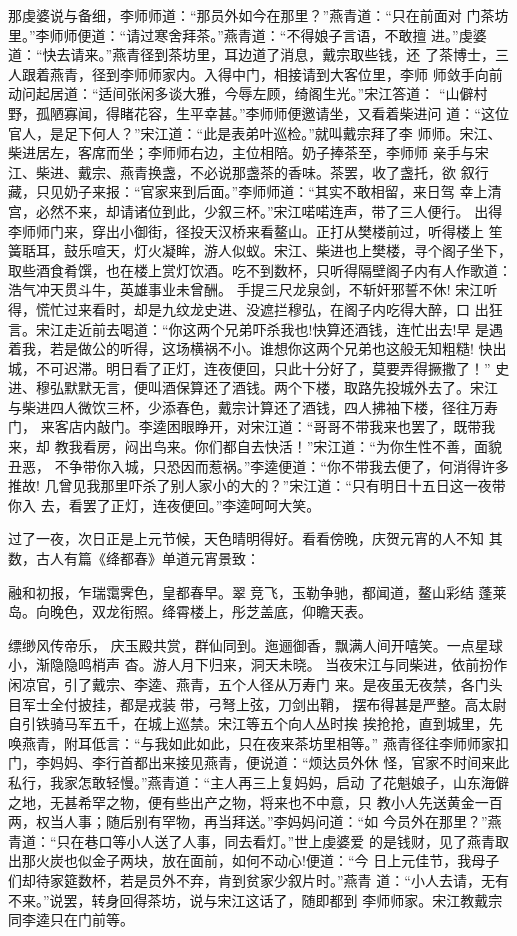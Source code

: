 那虔婆说与备细，李师师道：“那员外如今在那里？”燕青道：“只在前面对
门茶坊里。”李师师便道：“请过寒舍拜茶。”燕青道：“不得娘子言语，不敢擅
进。”虔婆道：“快去请来。”燕青径到茶坊里，耳边道了消息，戴宗取些钱，还
了茶博士，三人跟着燕青，径到李师师家内。入得中门，相接请到大客位里，李师
师敛手向前动问起居道：“适间张闲多谈大雅，今辱左顾，绮阁生光。”宋江答道：
“山僻村野，孤陋寡闻，得睹花容，生平幸甚。”李师师便邀请坐，又看着柴进问
道：“这位官人，是足下何人？”宋江道：“此是表弟叶巡检。”就叫戴宗拜了李
师师。宋江、柴进居左，客席而坐；李师师右边，主位相陪。奶子捧茶至，李师师
亲手与宋江、柴进、戴宗、燕青换盏，不必说那盏茶的香味。茶罢，收了盏托，欲
叙行藏，只见奶子来报：“官家来到后面。”李师师道：“其实不敢相留，来日驾
幸上清宫，必然不来，却请诸位到此，少叙三杯。”宋江喏喏连声，带了三人便行。
出得李师师门来，穿出小御街，径投天汉桥来看鳌山。正打从樊楼前过，听得楼上
笙簧聒耳，鼓乐喧天，灯火凝眸，游人似蚁。宋江、柴进也上樊楼，寻个阁子坐下，
取些酒食肴馔，也在楼上赏灯饮酒。吃不到数杯，只听得隔壁阁子内有人作歌道：
浩气冲天贯斗牛，英雄事业未曾酬。
手提三尺龙泉剑，不斩奸邪誓不休!
宋江听得，慌忙过来看时，却是九纹龙史进、没遮拦穆弘，在阁子内吃得大醉，口
出狂言。宋江走近前去喝道：“你这两个兄弟吓杀我也!快算还酒钱，连忙出去!早
是遇着我，若是做公的听得，这场横祸不小。谁想你这两个兄弟也这般无知粗糙!
快出城，不可迟滞。明日看了正灯，连夜便回，只此十分好了，莫要弄得撅撒了！”
史进、穆弘默默无言，便叫酒保算还了酒钱。两个下楼，取路先投城外去了。宋江
与柴进四人微饮三杯，少添春色，戴宗计算还了酒钱，四人拂袖下楼，径往万寿门，
来客店内敲门。李逵困眼睁开，对宋江道：“哥哥不带我来也罢了，既带我来，却
教我看房，闷出鸟来。你们都自去快活！”宋江道：“为你生性不善，面貌丑恶，
不争带你入城，只恐因而惹祸。”李逵便道：“你不带我去便了，何消得许多推故!
几曾见我那里吓杀了别人家小的大的？”宋江道：“只有明日十五日这一夜带你入
去，看罢了正灯，连夜便回。”李逵呵呵大笑。

过了一夜，次日正是上元节候，天色晴明得好。看看傍晚，庆贺元宵的人不知
其数，古人有篇《绛都春》单道元宵景致：

融和初报，乍瑞霭霁色，皇都春早。翠竞飞，玉勒争驰，都闻道，鳌山彩结
蓬莱岛。向晚色，双龙衔照。绛霄楼上，彤芝盖底，仰瞻天表。

缥缈风传帝乐，
庆玉殿共赏，群仙同到。迤逦御香，飘满人间开嘻笑。一点星球小，渐隐隐鸣梢声
杳。游人月下归来，洞天未晓。
当夜宋江与同柴进，依前扮作闲凉官，引了戴宗、李逵、燕青，五个人径从万寿门
来。是夜虽无夜禁，各门头目军士全付披挂，都是戎装带，弓弩上弦，刀剑出鞘，
摆布得甚是严整。高太尉自引铁骑马军五千，在城上巡禁。宋江等五个向人丛时挨
挨抢抢，直到城里，先唤燕青，附耳低言：“与我如此如此，只在夜来茶坊里相等。”
燕青径往李师师家扣门，李妈妈、李行首都出来接见燕青，便说道：“烦达员外休
怪，官家不时间来此私行，我家怎敢轻慢。”燕青道：“主人再三上复妈妈，启动
了花魁娘子，山东海僻之地，无甚希罕之物，便有些出产之物，将来也不中意，只
教小人先送黄金一百两，权当人事；随后别有罕物，再当拜送。”李妈妈问道：“如
今员外在那里？”燕青道：“只在巷口等小人送了人事，同去看灯。”世上虔婆爱
的是钱财，见了燕青取出那火炭也似金子两块，放在面前，如何不动心!便道：“今
日上元佳节，我母子们却待家筵数杯，若是员外不弃，肯到贫家少叙片时。”燕青
道：“小人去请，无有不来。”说罢，转身回得茶坊，说与宋江这话了，随即都到
李师师家。宋江教戴宗同李逵只在门前等。

